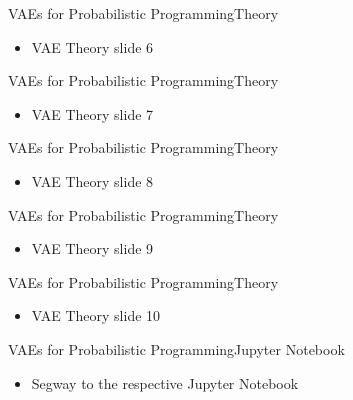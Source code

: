 \documentclass[AERbeamer%
              ,optEnglish%
              ,optBiber%
              ,optBibstyleAlphabetic%
              ,optBeamerClassicFormat%
              ]{AERlatex}%
\begin{document}
\begin{frame}[c]{VAEs for Probabilistic Programming}{Theory}
    \centering
    \begin{itemize}
        \item VAE Theory slide 6
    \end{itemize}
\end{frame}


\begin{frame}[c]{VAEs for Probabilistic Programming}{Theory}
    \centering
    \begin{itemize}
        \item VAE Theory slide 7
    \end{itemize}
\end{frame}


\begin{frame}[c]{VAEs for Probabilistic Programming}{Theory}
    \centering
    \begin{itemize}
        \item VAE Theory slide 8
    \end{itemize}
\end{frame}


\begin{frame}[c]{VAEs for Probabilistic Programming}{Theory}
    \centering
    \begin{itemize}
        \item VAE Theory slide 9
    \end{itemize}
\end{frame}


\begin{frame}[c]{VAEs for Probabilistic Programming}{Theory}
    \centering
    \begin{itemize}
        \item VAE Theory slide 10
    \end{itemize}
\end{frame}


\begin{frame}[c]{VAEs for Probabilistic Programming}{Jupyter Notebook}
    \centering
    \begin{itemize}
        \item Segway to the respective Jupyter Notebook
    \end{itemize}
\end{frame}



%
%
%
%
\end{document}
